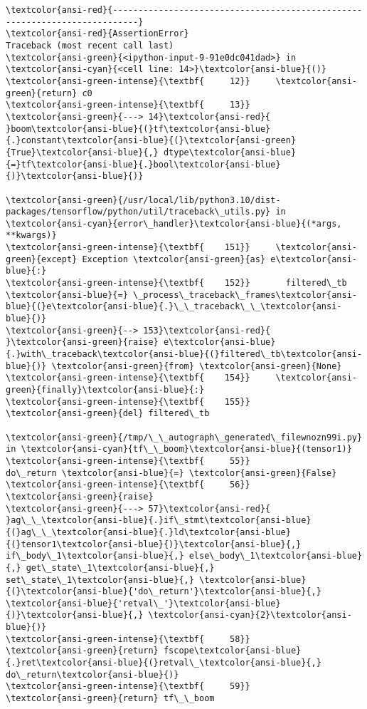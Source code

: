 \documentclass[11pt]{article}
\begin{document}
    \begin{Verbatim}[commandchars=\\\{\}, frame=single, framerule=2mm, rulecolor=\color{outerrorbackground}]
\textcolor{ansi-red}{---------------------------------------------------------------------------}
\textcolor{ansi-red}{AssertionError}                            Traceback (most recent call last)
\textcolor{ansi-green}{<ipython-input-9-91e0dc041dad>} in \textcolor{ansi-cyan}{<cell line: 14>}\textcolor{ansi-blue}{()}
\textcolor{ansi-green-intense}{\textbf{     12}}     \textcolor{ansi-green}{return} c0
\textcolor{ansi-green-intense}{\textbf{     13}} 
\textcolor{ansi-green}{---> 14}\textcolor{ansi-red}{ }boom\textcolor{ansi-blue}{(}tf\textcolor{ansi-blue}{.}constant\textcolor{ansi-blue}{(}\textcolor{ansi-green}{True}\textcolor{ansi-blue}{,} dtype\textcolor{ansi-blue}{=}tf\textcolor{ansi-blue}{.}bool\textcolor{ansi-blue}{)}\textcolor{ansi-blue}{)}

\textcolor{ansi-green}{/usr/local/lib/python3.10/dist-packages/tensorflow/python/util/traceback\_utils.py} in \textcolor{ansi-cyan}{error\_handler}\textcolor{ansi-blue}{(*args, **kwargs)}
\textcolor{ansi-green-intense}{\textbf{    151}}     \textcolor{ansi-green}{except} Exception \textcolor{ansi-green}{as} e\textcolor{ansi-blue}{:}
\textcolor{ansi-green-intense}{\textbf{    152}}       filtered\_tb \textcolor{ansi-blue}{=} \_process\_traceback\_frames\textcolor{ansi-blue}{(}e\textcolor{ansi-blue}{.}\_\_traceback\_\_\textcolor{ansi-blue}{)}
\textcolor{ansi-green}{--> 153}\textcolor{ansi-red}{       }\textcolor{ansi-green}{raise} e\textcolor{ansi-blue}{.}with\_traceback\textcolor{ansi-blue}{(}filtered\_tb\textcolor{ansi-blue}{)} \textcolor{ansi-green}{from} \textcolor{ansi-green}{None}
\textcolor{ansi-green-intense}{\textbf{    154}}     \textcolor{ansi-green}{finally}\textcolor{ansi-blue}{:}
\textcolor{ansi-green-intense}{\textbf{    155}}       \textcolor{ansi-green}{del} filtered\_tb

\textcolor{ansi-green}{/tmp/\_\_autograph\_generated\_filewnozn99i.py} in \textcolor{ansi-cyan}{tf\_\_boom}\textcolor{ansi-blue}{(tensor1)}
\textcolor{ansi-green-intense}{\textbf{     55}}                         do\_return \textcolor{ansi-blue}{=} \textcolor{ansi-green}{False}
\textcolor{ansi-green-intense}{\textbf{     56}}                         \textcolor{ansi-green}{raise}
\textcolor{ansi-green}{---> 57}\textcolor{ansi-red}{                 }ag\_\_\textcolor{ansi-blue}{.}if\_stmt\textcolor{ansi-blue}{(}ag\_\_\textcolor{ansi-blue}{.}ld\textcolor{ansi-blue}{(}tensor1\textcolor{ansi-blue}{)}\textcolor{ansi-blue}{,} if\_body\_1\textcolor{ansi-blue}{,} else\_body\_1\textcolor{ansi-blue}{,} get\_state\_1\textcolor{ansi-blue}{,} set\_state\_1\textcolor{ansi-blue}{,} \textcolor{ansi-blue}{(}\textcolor{ansi-blue}{'do\_return'}\textcolor{ansi-blue}{,} \textcolor{ansi-blue}{'retval\_'}\textcolor{ansi-blue}{)}\textcolor{ansi-blue}{,} \textcolor{ansi-cyan}{2}\textcolor{ansi-blue}{)}
\textcolor{ansi-green-intense}{\textbf{     58}}                 \textcolor{ansi-green}{return} fscope\textcolor{ansi-blue}{.}ret\textcolor{ansi-blue}{(}retval\_\textcolor{ansi-blue}{,} do\_return\textcolor{ansi-blue}{)}
\textcolor{ansi-green-intense}{\textbf{     59}}         \textcolor{ansi-green}{return} tf\_\_boom


\end{Verbatim}
\end{document}
